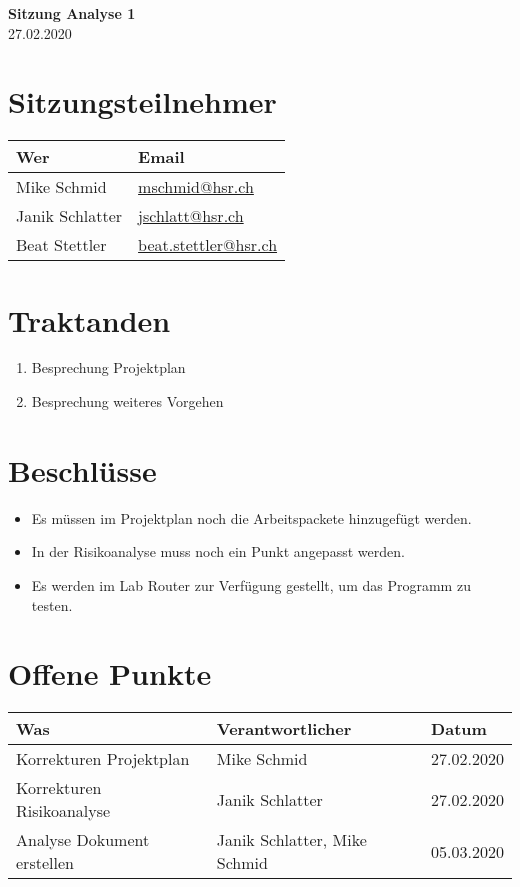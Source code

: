 \documentclass[
	ngerman,
	toc=listof, %
	toc=bibliography, %
	footnotes=multiple, %
	parskip=half, %
	numbers=noendperiod %
]{scrartcl}
\newcommand{\titel}{Sitzung Analyse 1}
\newcommand{\datum}{27.02.2020}
\begin{document}
\begin{center}
    \LARGE \textbf{\titel} \\[2ex]
    \large \datum \\[2ex]
\end{center}

\section*{Sitzungsteilnehmer}
\begin{tabularx}{0.9\linewidth}{Xl}
	\toprule
	Wer & Email \\
	\midrule
	Mike Schmid & \scriptsize \url{mschmid@hsr.ch} \\
	Janik Schlatter & \scriptsize \url{jschlatt@hsr.ch} \\
	Beat Stettler & \scriptsize \url{beat.stettler@hsr.ch} \\
	\bottomrule
\end{tabularx}

\section*{Traktanden}
\begin{enumerate}
    \item Besprechung Projektplan
    \item Besprechung weiteres Vorgehen
\end{enumerate}

\section*{Beschlüsse}
\begin{itemize}
	\item Es müssen im Projektplan noch die Arbeitspackete hinzugefügt werden.
	\item In der Risikoanalyse muss noch ein Punkt angepasst werden.
	\item Es werden im Lab Router zur Verfügung gestellt, um das Programm zu testen.
\end{itemize}

\section*{Offene Punkte}
\begin{tabularx}{0.9\linewidth}{Xll}
	\toprule
	Was & Verantwortlicher & Datum \\
	\midrule
	Korrekturen Projektplan & Mike Schmid & 27.02.2020 \\
	Korrekturen Risikoanalyse & Janik Schlatter & 27.02.2020 \\
	Analyse Dokument erstellen & Janik Schlatter, Mike Schmid & 05.03.2020 \\
	\bottomrule
\end{tabularx}
\end{document}
